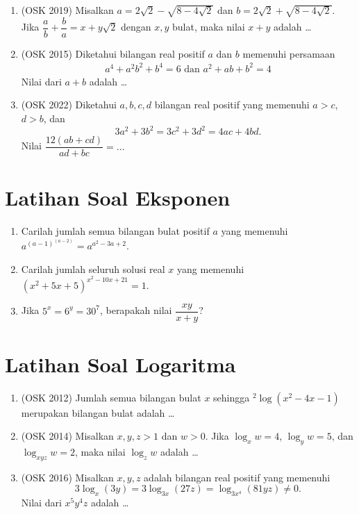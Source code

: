 \documentclass[12pt]{scrartcl}
\begin{document}
\begin{enumerate}
    \item (OSK 2019) Misalkan $a = 2\sqrt{2} - \sqrt{8-4\sqrt{2}}$ dan $b = 2\sqrt{2} + \sqrt{8-4\sqrt{2}}$. Jika $\dfrac{a}{b}+\dfrac{b}{a}=x+y\sqrt{2}$ dengan $x,y$ bulat, maka nilai $x+y$ adalah \dots

    \item (OSK 2015) Diketahui bilangan real positif $a$ dan $b$ memenuhi persamaan
    \begin{align*}
        a^4+a^2b^2+b^4=6 \text{ dan } a^2+ab+b^2=4
    \end{align*}
    Nilai dari $a + b$ adalah \ldots

    \item (OSK 2022) Diketahui $a,b,c,d$ bilangan real positif yang memenuhi $a>c$, $d>b$, dan 
    $$3a^2+3b^2=3c^2+3d^2=4ac+4bd.$$
    Nilai $\dfrac{12(ab+cd)}{ad+bc}=\dots$ 
\end{enumerate}

\section{Latihan Soal Eksponen}
\begin{enumerate}
    \item Carilah jumlah semua bilangan bulat positif $a$ yang memenuhi $a^{(a-1)^{(a-2)}}=a^{a^2-3a+2}$.
    
    \item Carilah jumlah seluruh solusi real $x$ yang memenuhi $(x^2+5x+5)^{x^2-10x+21}=1.$
    
    \item Jika $5^x=6^y=30^7$, berapakah nilai $\dfrac{xy}{x+y}$?
\end{enumerate}

\section{Latihan Soal Logaritma}
\begin{enumerate}  
    \item (OSK 2012) Jumlah semua bilangan bulat $x$ sehingga $^2 \log (x^2-4x-1)$ merupakan bilangan bulat adalah \dots
    
    \item (OSK 2014) Misalkan $x,y,z>1$ dan $w>0$. Jika $\log_x w = 4$, $\log_y w = 5$, dan $\log_{xyz} w = 2$, maka nilai $\log_z w$ adalah \dots 

    \item (OSK 2016) Misalkan $x,y,z$ adalah bilangan real positif yang memenuhi $$3 \log_x (3y) = 3 \log_{3x} (27z) = \log_{3x^4} (81yz) \neq 0.$$ Nilai dari $x^5y^4z$ adalah \dots
\end{enumerate}
\end{document}

